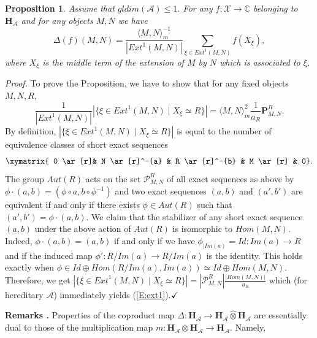 \documentclass[a4paper,10pt]{amsart}
\def\H{\mathbf{H}}
\def\qed{$\hfill \checkmark$}
\def\C{\mathbb{C}}
\def\A{\mathcal{A}}
\newtheorem{prop}[theo]{Proposition}
\numberwithin{equation}{section}
\begin{document}
\begin{prop}\label{P:coprophage} Assume that $gldim(\A) \leq 1$. For any $f: \mathcal{X} \to \C$ belonging to $\H_{\A}$ and for any objects $M,N$ we have
$$\Delta(f)(M,N)=\frac{\langle M,N\rangle_m^{-1}}{|{Ext}^1(M,N)|} \sum_{\xi \in {Ext}^1(M,N)} f(X_{\xi}),$$
where $X_\xi$ is the middle term of the extension of $M$ by $N$ which is associated to $\xi$.\end{prop}
\noindent
\textit{Proof.} To prove the Proposition, we have to show that for any fixed objects $M,N,R$,
\begin{equation}\label{E:ext1}
\frac{1}{| {Ext}^1(M,N)|} \left| \big\{ \xi \in {Ext}^1(M,N)\;|\; X_{\xi} \simeq R\big\}\right|=
\langle M,N\rangle_m^2 \frac{1}{a_R} \mathbf{P}^R_{M,N}.
\end{equation}
By definition, $\left|\big\{ \xi \in {Ext}^1(M,N)\;|\; X_{\xi} \simeq R\big\}\right|$ is equal to the number of equivalence classes of short exact sequences
\begin{equation}\label{E:ab}
\xymatrix{ 0 \ar[r]&  N \ar[r]^-{a} & R \ar[r]^-{b} & M \ar[r] & 0}.
\end{equation}
The group ${Aut}(R)$ acts on the set $\mathcal{P}^R_{M,N}$ of all exact sequences as above by
$\phi \cdot (a,b)=(\phi \circ a,b \circ \phi^{-1})$ and two exact sequences $(a,b)$ and $(a',b')$
are equivalent if and only if there exists $\phi \in {Aut}(R)$ such that $(a',b')=\phi\cdot(a,b)$. We claim that the stabilizer of any short exact sequence $(a,b)$ under the above action of ${Aut}(R)$ is isomorphic to ${Hom}(M,N)$. Indeed,  $\phi\cdot (a,b)=(a,b)$ if and only if we have $\phi_{|{Im}(a)}=Id: {Im}(a) \to R$ and if the induced map $\phi': R/{Im}(a) \to R/{Im}(a)$ is the identity. This holds exactly when
$\phi \in Id \oplus {Hom}(R/{Im}(a), {Im}(a)) \simeq Id \oplus {Hom}(M,N)$.
Therefore, we get $\left| \big\{ \xi \in {Ext}^1(M,N)\;|\; X_{\xi} \simeq R\big\}\right|=| \mathcal{P}^R_{M,N}| \frac{| {Hom}(M,N)|}{a_R}$ which (for hereditary $\mathcal{A}$) immediately yields (\ref{E:ext1}).\qed

\vspace{.2in}

\addtocounter{theo}{1}
\noindent \textbf{Remarks \thetheo .}  Properties of the coproduct map $\Delta: \H_{\A} \to \H_{\A} \widehat{\otimes} \H_\A$ are essentially dual to those of the multiplication map $m: \H_{\A} \otimes \H_{\A} \to \H_{\A}$. Namely,
\end{document}
